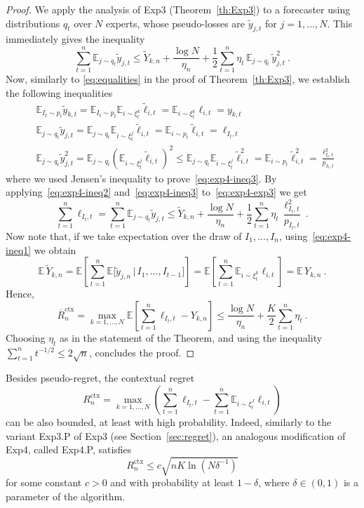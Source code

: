 \documentclass[11pt]{hackednow}
\newcommand{\E}{\mathbb{E}}
\newcommand{\oR}{\overline{R}}
\renewcommand{\tilde}{\widetilde}
\newcommand{\oRx}{\oR^{\mathrm{ctx}}}
\newcommand{\Rx}{R^{\mathrm{ctx}}}
\begin{document}
\begin{proof}
We apply the analysis of Exp3 (Theorem~\ref{th:Exp3}) to a forecaster using distributions $q_t$ over $N$ experts, whose pseudo-losses are $\tilde{y}_{j,t}$ for $j=1,\dots,N$. This immediately gives the inequality
\begin{equation}
\label{eq:exp4-exp3}
	\sum_{t=1}^n \E_{j \sim q_t}\tilde{y}_{j,t}
\le
	\tilde{Y}_{k,n} + \frac{\log N}{\eta_n} + \frac{1}{2}\sum_{t=1}^n \eta_t\,\E_{j \sim q_t}\,\tilde{y}_{j,t}^2~.
\end{equation}
Now, similarly to \eqref{eq:equalities} in the proof of Theorem~\ref{th:Exp3}, we establish the following inequalities
\begin{align}
\label{eq:exp4-ineq1}
	&\E_{I_t \sim p_t} \tilde{y}_{k,t} = \E_{I_t \sim p_t} \E_{i \sim \xi_t^k} \tilde{\ell}_{i,t} = \E_{i \sim \xi_t^k} \ell_{i,t} = y_{k,t}
\\
\label{eq:exp4-ineq2}
	&\E_{j \sim q_t} \tilde{y}_{j,t} = \E_{j \sim q_t} \E_{i \sim \xi_t^j} \tilde{\ell}_{i,t} = \E_{i \sim p_t} \tilde{\ell}_{i,t} = \ell_{I_t,t}
\\
\label{eq:exp4-ineq3}
	&\E_{j \sim q_t} \tilde{y}^2_{j,t} = \E_{j \sim q_t} \left(\E_{i \sim \xi_t^j} \tilde{\ell}_{i,t}\right)^2 \le \E_{j \sim q_t} \E_{i \sim \xi_t^j} \tilde{\ell}_{i,t}^2 = \E_{i \sim p_t} \tilde{\ell}_{i,t}^2 = \frac{\ell_{I_t,t}^2}{p_{I_t,t}}
\end{align}
where we used Jensen's inequality to prove~\eqref{eq:exp4-ineq3}.
By applying~\eqref{eq:exp4-ineq2} and~\eqref{eq:exp4-ineq3} to~\eqref{eq:exp4-exp3} we get
\[
	\sum_{t=1}^n \ell_{I_t,t}
=
	\sum_{t=1}^n \E_{j \sim q_t} \tilde{y}_{j,t}
\le
	\tilde{Y}_{k,n} + \frac{\log N}{\eta_n} + \frac{1}{2}\sum_{t=1}^n \eta_t\,\frac{\ell_{I_t,t}^2}{p_{I_t,t}}~.
\]
Now note that, if we take expectation over the draw of $I_1,\dots,I_n$, using~\eqref{eq:exp4-ineq1} we obtain
\[
	\E\,\tilde{Y}_{k,n} = \E\left[\sum_{t=1}^n \E\bigl[\tilde{y}_{j,n} \,\big|\, I_1,\dots,I_{t-1} \bigr] \right] =  \E\left[\sum_{t=1}^n \E_{i \sim \xi_t^k} \ell_{i,t} \right] = \E\,Y_{k,n}~.
\]
Hence,
\[
	\oRx_n = \max_{k=1,\dots,N} \E\left[ \sum_{t=1}^n \ell_{I_t,t} - Y_{k,n} \right]
\le
	 \frac{\log N}{\eta_n} + \frac{K}{2}\sum_{t=1}^n \eta_t~.
\]
Choosing $\eta_t$ as in the statement of the Theorem, and using the inequality $\sum_{t=1}^n t^{-1/2} \le 2\sqrt{n}$, concludes the proof.
\end{proof}
Besides pseudo-regret, the contextual regret
\[
	\Rx_n = \max_{k=1,\dots,N} \left( \sum_{t=1}^n \ell_{I_t,t} - \sum_{t=1}^n \E_{i \sim \xi_t^J} \ell_{i,t} \right)
\]
can be also bounded, at least with high probability. Indeed, similarly to the variant Exp3.P of Exp3 (see Section~\ref{sec:regret}), an analogous modification of Exp4, called Exp4.P, satisfies
\[
    \Rx_n \le c\sqrt{n K \ln(N \delta^{-1})}
\]
for some constant $c > 0$ and with probability at least $1-\delta$, where $\delta \in (0,1)$ is a parameter of the algorithm.
\end{document}
